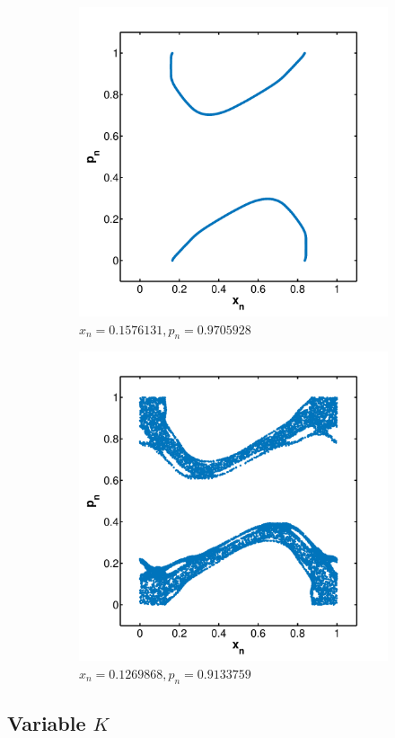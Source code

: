 \begin{figure}
	\begin{subfigure}{0.9\columnwidth}
		\centering
		\includegraphics[width=\textwidth]{./img/assignment_a_1_dim}
		\caption{$x_n = \num{0.1576131}, p_n = \num{0.9705928}$}
		\label{fig:experiment:dimension:one}
	\end{subfigure}

	\begin{subfigure}{0.9\columnwidth}
		\centering
		\includegraphics[width=\textwidth]{./img/assignment_a_2_dim}
		\caption{$x_n = \num{0.1269868}, p_n = \num{0.9133759}$}
		\label{fig:experiment:dimension:two}
	\end{subfigure}
	\caption{}
	\label{fig:experiment:dimension}
\end{figure}

\subsection{Variable $K$}